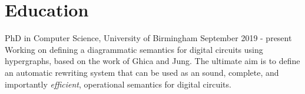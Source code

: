 \section*{Education}
\stroke

\begin{education}{%
    PhD in Computer Science, University of Birmingham
}{September 2019 - present}%
    \noindent
    Working on defining a diagrammatic semantics for digital circuits using
    hypergraphs, based on the work of Ghica and Jung. The ultimate aim is to
    define an automatic rewriting system that can be used as an sound, complete,
    and importantly \textit{efficient}, operational semantics for digital
    circuits.
\end{education}

\vspace{0.4em}

